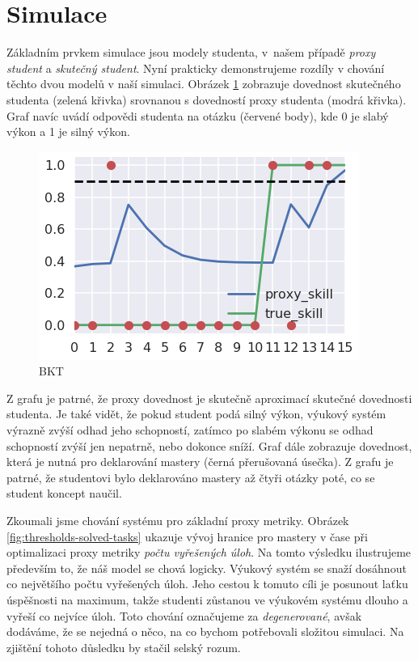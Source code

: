 \documentclass[twocolumn,10pt,cleanfoot]{asme2ej}
\begin{document}
\section{Simulace}

Základním prvkem simulace jsou modely studenta, v~našem případě \emph{proxy student} a
\emph{skutečný student}. Nyní prakticky demonstrujeme rozdíly v chování těchto dvou modelů v naší simulaci.
Obrázek \ref{fig:bkt} zobrazuje dovednost skutečného studenta (zelená křivka) srovnanou s dovedností proxy studenta (modrá křivka). Graf navíc uvádí odpovědi studenta na otázku (červené body), kde 0 je slabý výkon a 1 je silný výkon.


\begin{figure}[htb]
\centering
\includegraphics[width=\columnwidth]{img/bkt}
\caption{BKT}
\label{fig:bkt}
\end{figure}

Z grafu je patrné, že proxy dovednost je skutečně aproximací skutečné dovednosti studenta. Je také vidět, že pokud student podá silný výkon, výukový systém výrazně zvýší odhad jeho schopností, zatímco po slabém výkonu se odhad schopností zvýší jen nepatrně, nebo dokonce sníží. Graf dále zobrazuje dovednost, která je nutná pro deklarování mastery (černá přerušovaná úsečka). Z grafu je patrné, že studentovi bylo deklarováno mastery až čtyři otázky poté, co se student koncept naučil.

Zkoumali jsme chování systému pro základní proxy metriky. Obrázek \ref{fig:thresholds-solved-tasks} ukazuje vývoj hranice pro mastery v čase při optimalizaci proxy metriky \emph{počtu vyřešených úloh}.
Na tomto výsledku ilustrujeme především to, že náš model se chová logicky. Výukový systém se snaží dosáhnout co největšího počtu vyřešených úloh. Jeho cestou k tomuto cíli je posunout laťku úspěšnosti na maximum, takže studenti zůstanou ve výukovém systému dlouho a vyřeší co nejvíce úloh. Toto chování označujeme za \emph{degenerované}, avšak dodáváme, že se nejedná o něco, na co bychom potřebovali složitou simulaci. Na zjištění tohoto důsledku by stačil selský rozum.
\end{document}
